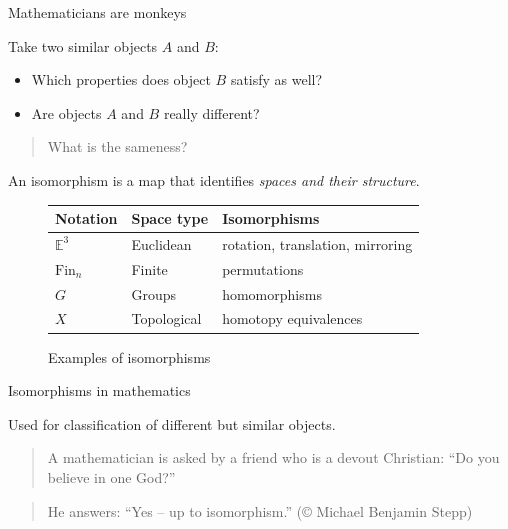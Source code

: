 \documentclass[english,handout]{beamer}
\begin{document}
\begin{frame}{Mathematicians are monkeys}

Take two similar objects $A$ and $B$:

\begin{itemize}
 \item Which properties does object $B$ satisfy as well?
 \item Are objects $A$ and $B$ really different?
\end{itemize}


\begin{quotation}
 What is the sameness?
\end{quotation}

\begin{definition}
 An isomorphism is a map that identifies \emph{spaces and their structure}.
\end{definition}


\begin{figure}
\begin{centering}
\begin{table}[]
\begin{tabular}{lll}
\hline
Notation       & Space type         & Isomorphisms                          \\ \hline
$\mathbb{E}^3$ & Euclidean     & rotation, translation, mirroring      \\
$\text{Fin}_n$ & Finite        & permutations                          \\
$G$            & Groups             & homomorphisms                         \\ 
$X$            & Topological & homotopy equivalences
\end{tabular}
\end{table}
\caption{Examples of isomorphisms}
\end{centering}
\end{figure}
 

\end{frame}

\begin{frame}{Isomorphisms in mathematics}

Used for classification of different but similar objects.

\begin{quotation}
   
    A mathematician is asked by a friend who is a devout Christian: ``Do you believe in one God?'' 
\end{quotation}

    \pause{}
    
    \begin{quotation}
    He answers: ``Yes -- up to isomorphism.'' (© Michael Benjamin Stepp)
\end{quotation}
    
    





\end{frame}
\end{document}
